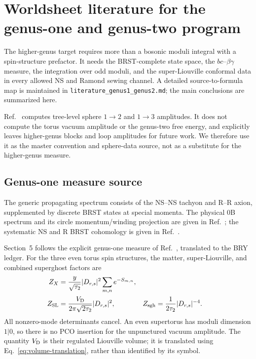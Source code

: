 \documentclass[11pt]{article}
\newcommand{\SL}{\mathrm{SL}}
\begin{document}
\section{Worldsheet literature for the genus-one and genus-two program}

The higher-genus target requires more than a bosonic moduli integral with a
spin-structure prefactor.  It needs the BRST-complete state space, the
$bc$--$\beta\gamma$ measure, the integration over odd moduli, and the
super-Liouville conformal data in every allowed NS and Ramond sewing channel.
A detailed source-to-formula map is maintained in
\texttt{literature\_genus1\_genus2.md}; the main conclusions are summarized
here.

Ref.~\cite{BalthazarRodriguezYin2023SMatrix} computes tree-level sphere
$1\to2$ and $1\to3$ amplitudes.  It does not compute the torus vacuum
amplitude or the genus-two free energy, and explicitly leaves higher-genus
blocks and loop amplitudes for future work.  We therefore use it as the
master convention and sphere-data source, not as a substitute for the
higher-genus measure.

\subsection{Genus-one measure source}

The generic propagating spectrum consists of the NS--NS tachyon and R--R axion,
supplemented by discrete BRST states at special momenta.  The physical 0B
spectrum and its circle momentum/winding projection are given in
Ref.~\cite{DouglasEtAl2003NewHat}; the systematic NS and R BRST cohomology is
given in Ref.~\cite{ItohOhta1992BRST}.

Section~5 follows the explicit genus-one measure of
Ref.~\cite{DouglasEtAl2003NewHat}, translated to the BRY ledger.  For the
three even torus spin structures, the matter, super-Liouville, and combined
superghost factors are
\begin{align}
 Z_X&=\frac{y}{\sqrt{\tau_2}}|D_{r,s}|^2
       \sum_{m,n}e^{-S_{m,n}},\notag\\
 Z_{\SL}&=\frac{V_{\rm D}}{2\pi\sqrt{2\tau_2}}|D_{r,s}|^2,
 &
 Z_{\rm sgh}&=\frac{1}{2\tau_2}|D_{r,s}|^{-4}.
 \label{eq:torus-determinants}
\end{align}
All nonzero-mode determinants cancel.  An even supertorus has moduli
dimension $1|0$, so there is no PCO insertion for the unpunctured vacuum
amplitude.  The quantity $V_{\rm D}$ is their regulated Liouville volume;
it is translated using Eq.~\eqref{eq:volume-translation}, rather than
identified by its symbol.
\end{document}

